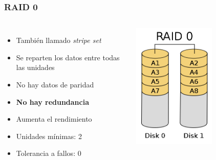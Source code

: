 \documentclass[aspectratio=169]{beamer}
\begin{document}
\begin{frame}
  \frametitle{RAID 0}
  \begin{columns}
    \begin{itemize}
    \item También llamado \emph{stripe set}
    \item Se reparten los datos entre todas las unidades
    \item No hay datos de paridad
    \item \textbf{No hay redundancia}
    \item Aumenta el rendimiento
    \item Unidades mínimas: 2
    \item Tolerancia a fallos: 0
    \end{itemize}
    \includegraphics[width=0.6\textwidth]{img/RAID0}
  \end{columns}
  
\end{frame}
\end{document}
